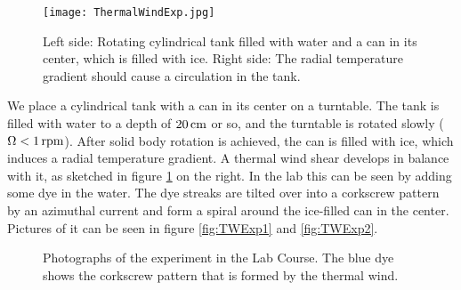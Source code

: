 \documentclass[12pt, a4paper]{article} %
\newcommand{\todoRef}{\todo[color=green!20]}
\begin{document}
		\begin{figure}[h]
			\centering
			\texttt{[image: ThermalWindExp.jpg]}
			\caption{Left side: Rotating cylindrical tank filled with water and a can in its center, which is filled with ice. Right side: The radial temperature gradient should cause a circulation in the tank.} %
			\label{fig:TWExperiment}
		\end{figure}
		
		We place a cylindrical tank with a can in its center on a turntable. The tank is filled with water to a depth of $\unit[20]{cm}$ or so, and the turntable is rotated slowly ($\Omega < \unit[1]{rpm}$). After solid body rotation is achieved, the can is filled with ice, which induces a radial temperature gradient. A thermal wind shear develops in balance with it, as sketched in figure \ref{fig:TWExperiment} on the right.
		\newline
		In the lab this can be seen by adding some dye in the water. The dye streaks are tilted over into a corkscrew pattern by an azimuthal current and form a spiral around the ice-filled can in the center. Pictures of it can be seen in figure \ref{fig:TWExp1} and \ref{fig:TWExp2}.
		
		
		\begin{figure}
				\centering
			\caption{Photographs of the experiment in the Lab Course. The blue dye shows the corkscrew pattern that is formed by the thermal wind.}
		\end{figure}
		
\end{document}
